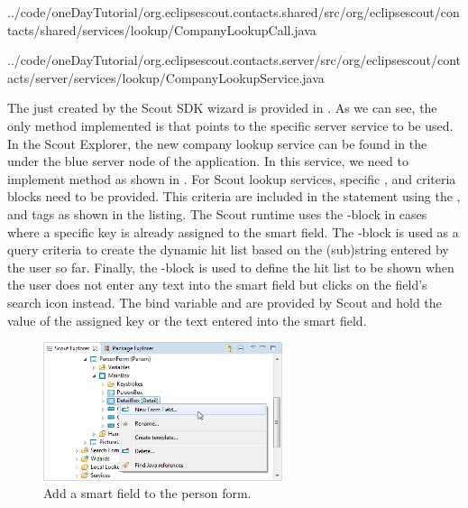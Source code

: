 \documentclass[a4paper,10pt,twoside]{book}
\begin{document}

{../code/oneDayTutorial/org.eclipsescout.contacts.shared/src/org/eclipsescout/contacts/shared/services/lookup/CompanyLookupCall.java}


{../code/oneDayTutorial/org.eclipsescout.contacts.server/src/org/eclipsescout/contacts/server/services/lookup/CompanyLookupService.java}

The  just created by the Scout SDK wizard is provided in . 
As we can see, the only method implemented is  that points to the specific server service to be used. 
In the Scout Explorer, the new company lookup service can be found in the  under the blue server node of the application. 
In this service, we need to implement method  as shown in . 
For Scout lookup services, specific ,  and  criteria blocks need to be provided. 
This criteria are included in the  statement using the ,  and  tags as shown in the listing. 
The Scout runtime uses the -block in cases where a specific key is already assigned to the smart field. 
The -block is used as a query criteria to create the dynamic  hit list based on the (sub)string entered by the user so far.
Finally, the -block is used to define the hit list to be shown when the user does not enter any text into the smart field but clicks on the field's search icon instead. 
The bind variable  and  are provided by Scout and hold the value of the assigned key or the text entered into the smart field. 

\begin{figure}
\includegraphics[width=7cm]{new_smartfield_company_contextmenu.png}
\caption{Add a smart field to the person form.}
\end{figure}
\end{document}
